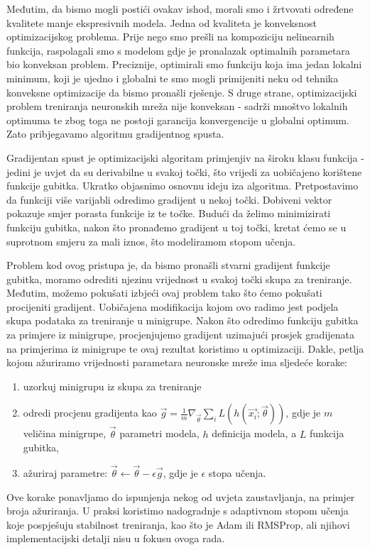 Međutim, da bismo mogli postići ovakav ishod, morali smo i žrtvovati određene kvalitete manje ekspresivnih modela. Jedna od kvaliteta je konveksnost optimizacijskog problema. Prije nego smo prešli na kompoziciju nelinearnih funkcija, raspolagali smo s modelom gdje je pronalazak optimalnih parametara bio konveksan problem. Preciznije, optimirali smo funkciju koja ima jedan lokalni minimum, koji je ujedno i globalni te smo mogli primijeniti neku od tehnika konveksne optimizacije da bismo pronašli rješenje. S druge strane, optimizacijski problem treniranja neuronskih mreža nije konveksan - sadrži mnoštvo lokalnih optimuma te zbog toga ne postoji garancija konvergencije u globalni optimum. Zato pribjegavamo algoritmu gradijentnog spusta.

Gradijentan spust je optimizacijski algoritam primjenjiv na široku klasu funkcija - jedini je uvjet da su derivabilne u svakoj točki, što vrijedi za uobičajeno korištene funkcije gubitka. Ukratko objasnimo osnovnu ideju iza algoritma. Pretpostavimo da funkciji više varijabli odredimo gradijent u nekoj točki. Dobiveni vektor pokazuje smjer porasta funkcije iz te točke. Budući da želimo minimizirati funkciju gubitka, nakon što pronađemo gradijent u toj točki, kretat ćemo se u suprotnom smjeru za mali iznos, što modeliramom stopom učenja. 

Problem kod ovog pristupa je, da bismo pronašli stvarni gradijent funkcije gubitka, moramo odrediti njezinu vrijednost u svakoj točki skupa za treniranje. Međutim, možemo pokušati izbjeći ovaj problem tako što ćemo pokušati procijeniti gradijent. Uobičajena modifikacija kojom ovo radimo jest podjela skupa podataka za treniranje u minigrupe. Nakon što odredimo funkciju gubitka za primjere iz minigrupe, procjenjujemo gradijent uzimajući prosjek gradijenata na primjerima iz minigrupe te ovaj rezultat koristimo u optimizaciji. Dakle, petlja kojom ažuriramo vrijednosti parametara neuronske mreže ima sljedeće korake:
\begin{enumerate}
	\item uzorkuj minigrupu iz skupa za treniranje
	\item odredi procjenu gradijenta kao $\vec{g} = \frac{1}{m}\nabla_{\vec{\theta}}\sum_i L(h(\vec{x_i}; \vec{\theta}))$, gdje je $m$ veličina minigrupe, $\vec{\theta}$ parametri modela, $h$ definicija modela, a $L$ funkcija gubitka,
	\item ažuriraj parametre: $\vec{\theta} \leftarrow \vec{\theta} - \epsilon\vec{g}$, gdje je $\epsilon$ stopa učenja.
\end{enumerate}
Ove korake ponavljamo do ispunjenja nekog od uvjeta zaustavljanja, na primjer broja ažuriranja. U praksi koristimo nadogradnje s adaptivnom stopom učenja koje pospješuju stabilnost treniranja, kao što je Adam \citep{kingma2014adam} ili RMSProp, ali njihovi implementacijski detalji nisu u fokusu ovoga rada.